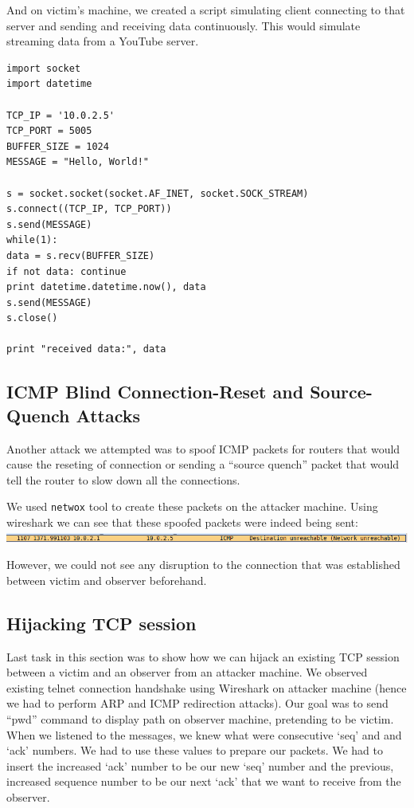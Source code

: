 \documentclass[12pt, a4paper, pdflatex]{article}
\begin{document}
And on victim's machine, we created a script simulating client connecting to that server and sending and receiving data continuously. This would simulate streaming data from a YouTube server.\\
\lstset{
	captionpos=b,
	frame=single,
	language=Python,
	breaklines=true,
	label=youtube2
}
\begin{lstlisting}
import socket
import datetime

TCP_IP = '10.0.2.5'
TCP_PORT = 5005
BUFFER_SIZE = 1024
MESSAGE = "Hello, World!"

s = socket.socket(socket.AF_INET, socket.SOCK_STREAM)
s.connect((TCP_IP, TCP_PORT))
s.send(MESSAGE)
while(1):
data = s.recv(BUFFER_SIZE)
if not data: continue
print datetime.datetime.now(), data
s.send(MESSAGE)
s.close()

print "received data:", data
\end{lstlisting}


\subsection{ICMP Blind Connection-Reset and Source-Quench Attacks}

Another attack we attempted was to spoof ICMP packets for routers that would cause the reseting of connection or sending a ``source quench'' packet that would tell the router to slow down all the connections.

We used \texttt{netwox} tool to create these packets on the attacker machine.
Using wireshark we can see that these spoofed packets were indeed being sent:\\

\includegraphics[width=.95\textwidth]{gfx/unrechable.png}

However, we could not see any disruption to the connection that was established between victim and observer beforehand.


\subsection{Hijacking TCP session}

Last task in this section was to show how we can hijack an existing TCP session
between a victim and an observer from an attacker machine. We observed existing telnet
connection handshake using Wireshark on attacker machine (hence we had to perform ARP and ICMP redirection attacks).
Our goal was to send ``pwd'' command to display path on observer machine, pretending to be victim. When we listened to the
messages, we knew what were consecutive `seq' and and `ack' numbers. We had to use these values to prepare our packets. We had to insert
the increased `ack' number to be our new `seq' number and the previous, increased sequence number to be our next `ack' that we want to receive from the observer.
\end{document}
